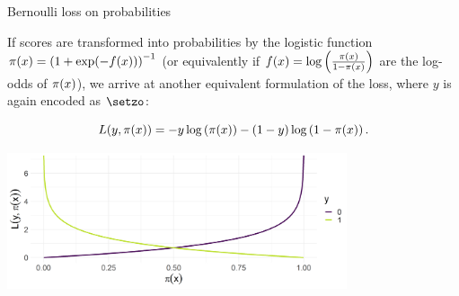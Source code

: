 \begin{vbframe}{Bernoulli loss on probabilities}

If scores are transformed into probabilities by the logistic function  $\pi(x) = \left(1 + \exp(- f(x))\right)^{-1}$ (or equivalently if $f(x) = \log\left(\frac{\pi(x)}{1 - \pi(x)}\right)$ are the log-odds of $\pi(x)$), we arrive at another equivalent formulation of the loss, where $y$ is again encoded as $\setzo$:

  $$
    L(y, \pi(x)) = - y \log \left(\pi(x)\right) - (1 - y) \log \left(1 - \pi(x)\right). 
  $$
  
\begin{center}
\includegraphics[width = 10cm ]{figure/plot_bernoulli_prob.png}
\end{center}

\end{vbframe}



